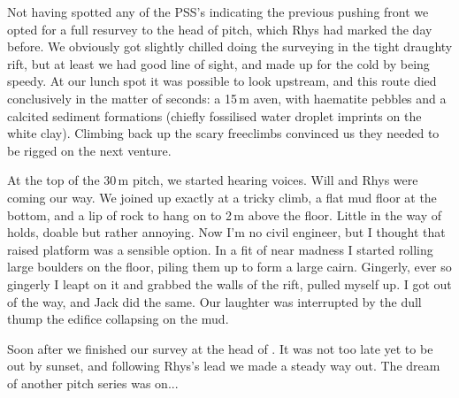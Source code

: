 Not having spotted any of the PSS's indicating the previous pushing front we opted for a full resurvey to the head of  pitch, which Rhys had marked the day before. We obviously got slightly chilled doing the surveying in the tight draughty rift, but at least we had good line of sight, and made up for the cold by being speedy. At our lunch spot it was possible to look upstream, and this route died conclusively in the matter of seconds: a 15\,m aven, with haematite pebbles and a calcited sediment formations (chiefly fossilised water droplet imprints on the white clay). Climbing back up the scary freeclimbs convinced us they needed to be rigged on the next venture. 

At the top of the 30\,m pitch, we started hearing voices. Will and Rhys were coming our way. We joined up exactly at a tricky climb, a flat mud floor at the bottom, and a lip of rock to hang on to 2\,m above the floor. Little in the way of holds, doable but rather annoying. Now I'm no civil engineer, but I thought that raised platform was a sensible option. In a fit of near madness I started rolling large boulders on the floor, piling them up to form a large cairn. Gingerly, ever so gingerly I leapt on it and grabbed the walls of the rift, pulled myself up. I got out of the way, and Jack did the same. Our laughter was interrupted by the dull thump the edifice collapsing on the mud. 

Soon after we finished our survey at the head of . It was not too late yet to be out by sunset, and following Rhys's lead we made a steady way out. The dream of another pitch series was on... 

